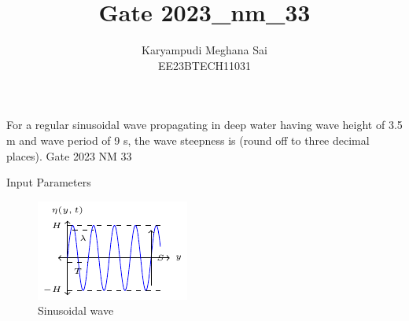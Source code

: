 \documentclass[journal,12pt,onecolumn]{IEEEtran}
\theoremstyle{remark}
\begin{document}
\let\vec\mathbf







\bigskip


\title{Gate 2023\_nm\_33}
\author{Karyampudi Meghana Sai\\ EE23BTECH11031}

\maketitle

For a regular sinusoidal wave propagating in deep water having wave height of 3.5 m and wave period of 9 s, the wave steepness is \underline{\hspace{1cm}} (round off to three decimal places).
\hfill Gate 2023 NM 33

\solution

\begin{table}[h]
 	\centering
 	\resizebox{6 cm}{!}{
 		
 	}
 	\vspace{6 pt}
 	\caption{Input Parameters}
 	\label{} 
 \end{table} 
 
 \begin{figure}[h!]
    \centering
    \includegraphics[width=\columnwidth]{figs/figs1.pdf}
    \caption{Sinusoidal wave}
    \label{fig:}
\end{figure} 
\end{document}
